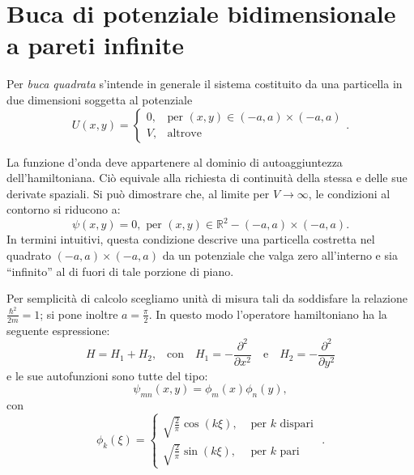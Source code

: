 \clearpage{}\section{Buca di potenziale bidimensionale a pareti infinite}

Per \emph{buca quadrata} s'intende in generale il sistema costituito da una
particella in due dimensioni soggetta al potenziale
\[
U(x,y)=\begin{cases}
        0,      & \text{per }(x,y) \in (-a, a)\times(-a, a) \\
        V,      & \text{altrove }
\end{cases}. \label{eq:potenziale_bucaquadratafinita}
\]

La funzione d'onda deve appartenere al dominio di autoaggiuntezza 
dell'hamiltoniana. Ciò equivale alla
richiesta di continuità della stessa e delle sue derivate spaziali.
Si può dimostrare che, al limite per $V\rightarrow\infty$, 
le condizioni al contorno si riducono a:
\[
\psi(x,y) = 0, \text{ per } (x, y) \in 
	\mathbb{R}^2 - \left(-a,a\right)\times\left(-a,a\right)  .
\label{eq:contorno_buca2dinf}
\]
In termini intuitivi, questa condizione descrive una particella costretta
nel quadrato $(-a, a)\times(-a, a)$ da un potenziale che valga zero
all'interno e sia ``infinito'' al di fuori di tale porzione di piano.


Per semplicità di calcolo scegliamo unità di misura tali da soddisfare 
la relazione $\frac{\hbar^2}{2m}=1$; si pone inoltre $a=\frac{\pi}{2}$.
In questo modo l'operatore hamiltoniano ha la seguente espressione:
\begin{equation*}\label{eq:H_buca}
    H=H_{1}+H_{2}\text{,}
      \quad\text{con}
      \quad H_{1}=-\frac{\partial^{2}}{\partial x^{2}}
      \quad\text{e}\quad H_{2}=-\frac{\partial^{2}}{\partial y^{2}} 
\end{equation*}
e le sue autofunzioni sono tutte del tipo:
\begin{equation}
\psi_{mn}(x,y) = \phi_m(x)\phi_n(y) , \label{eq:autofunz_buca}
\end{equation}
con
\begin{equation}\phi_k(\xi)=\begin{cases}
  \sqrt{\frac{2}{\pi}}\cos(k\xi), & \text{ per } k \text{ dispari } \\
  \sqrt{\frac{2}{\pi}}\sin(k\xi), & \text{ per } k \text{ pari }
\end{cases}. \label{eq:phi} \end{equation}

